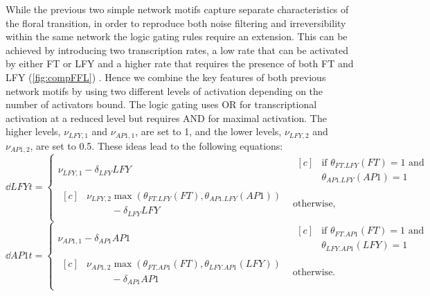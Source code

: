 While the previous two simple network motifs capture separate characteristics of the floral transition, in order to reproduce both noise filtering and irreversibility within the same network the logic gating rules require an extension.
This can be achieved by introducing two transcription rates, a low rate that can be activated by either FT or LFY and a higher rate that requires the presence of both FT and LFY (\autoref{fig:compFFL})
.
Hence we combine the key features of both previous network motifs by using two different levels of activation depending on the number of activators bound.
The logic gating uses OR for transcriptional activation at a reduced level but requires AND for maximal activation.
The higher levels, $\nu_{LFY,1}$ and $\nu_{AP1,1}$, are set to 1, and the lower levels, $\nu_{LFY,2}$ and $\nu_{AP1,2}$, are set to 0.5.
These ideas lead to the following equations:
\begin{equation*}
\dd{LFY}{t}  =
  \begin{cases} 
\nu_{LFY,1} - \delta_{LFY}LFY & 
    \begin{aligned}[c]
       & \text{if }\theta_{FT.LFY}\left(FT\right)=1 \text{ and } \\
       & \theta_{AP1.LFY} \left(AP1\right) =1
    \end{aligned}   \\[1ex]
\!\begin{aligned}[c]
       & \nu_{LFY,2} \max\left(\theta_{FT.LFY} \left(FT\right),\theta_{AP1.LFY}
  \left(AP1\right)\right)\\
& \phantom{\nu_{LFY,1}}- \delta_{LFY}LFY
\end{aligned} & \text{otherwise,}
  \end{cases}
  \end{equation*}
\begin{equation*}
\dd{AP1}{t}  =
  \begin{cases} 
\nu_{AP1,1} - \delta_{AP1}AP1 & 
    \begin{aligned}[c]
       & \text{if }\theta_{FT.AP1}\left(FT\right)=1 \text{ and } \\
       & \theta_{LFY.AP1} \left(LFY\right) =1
    \end{aligned}   \\[1ex]
\!\begin{aligned}[c]
       & \nu_{AP1,2} \max\left(\theta_{FT.AP1} \left(FT\right),\theta_{LFY.AP1}
  \left(LFY\right)\right)\\
& \phantom{\nu_{AP1,1}}- \delta_{AP1}AP1
\end{aligned} & \text{otherwise.}
  \end{cases}
  \end{equation*}
  
